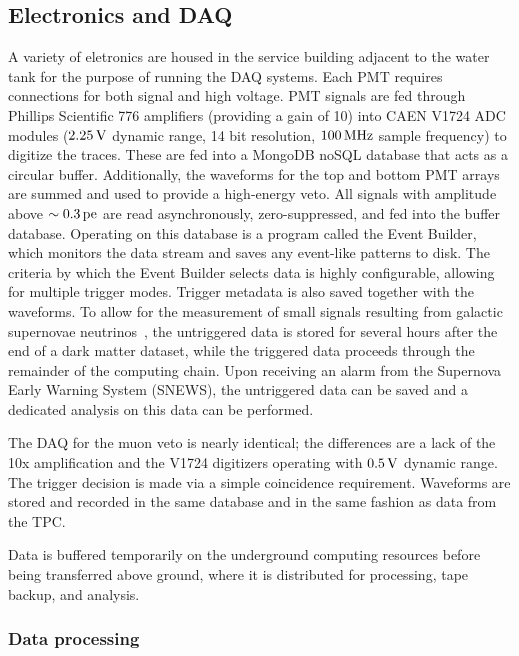 \subsection{Electronics and DAQ}

A variety of eletronics are housed in the service building adjacent to the water tank for the purpose of running the DAQ systems. Each PMT requires connections for both signal and high voltage. PMT signals are fed through Phillips Scientific 776 amplifiers (providing a gain of 10) into CAEN V1724 ADC modules ($2.25\,\mathrm{V}$ dynamic range, 14 bit resolution, $100\,\mathrm{MHz}$ sample frequency) to digitize the traces. These are fed into a MongoDB noSQL database that acts as a circular buffer. Additionally, the waveforms for the top and bottom PMT arrays are summed and used to provide a high-energy veto. All signals with amplitude above $\sim 0.3\,\mathrm{pe}$ are read asynchronously, zero-suppressed, and fed into the buffer database. Operating on this database is a program called the Event Builder, which monitors the data stream and saves any event-like patterns to disk. The criteria by which the Event Builder selects data is highly configurable, allowing for multiple trigger modes. Trigger metadata is also saved together with the waveforms. To allow for the measurement of small signals resulting from galactic supernovae neutrinos~\cite{Lang:2016zhv}, the untriggered data is stored for several hours after the end of a dark matter dataset, while the triggered data proceeds through the remainder of the computing chain. Upon receiving an alarm from the Supernova Early Warning System (SNEWS), the untriggered data can be saved and a dedicated analysis on this data can be performed.

The DAQ for the muon veto is nearly identical; the differences are a lack of the 10x amplification and the V1724 digitizers operating with $0.5\,\mathrm{V}$ dynamic range. The trigger decision is made via a simple coincidence requirement. Waveforms are stored and recorded in the same database and in the same fashion as data from the TPC.

Data is buffered temporarily on the underground computing resources before being transferred above ground, where it is distributed for processing, tape backup, and analysis.

\subsubsection{Data processing}

